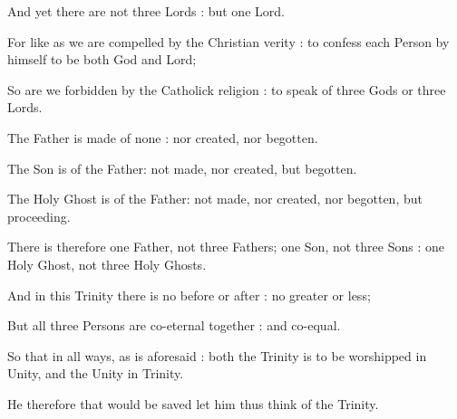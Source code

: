 {    And yet there are not three Lords : but one Lord.\par
    For like as we are compelled by the Christian verity : to confess each Person by himself to be both God and Lord;\par
    So are we forbidden by the Catholick religion : to speak of three Gods or three Lords.\par
    The Father is made of none : nor created, nor begotten.\par
    The Son is of the Father: not made, nor created, but begotten.\par
    The Holy Ghost is of the Father: not made, nor created, nor begotten, but proceeding.\par
    There is therefore one Father, not three Fathers; one Son, not three Sons : one Holy Ghost, not three Holy Ghosts.\par
    And in this Trinity there is no before or after : no greater or less;\par
    But all three Persons are co-eternal together : and co-equal.\par
    So that in all ways, as is aforesaid : both the Trinity is to be worshipped in Unity, and the Unity in Trinity.\par
    He therefore that would be saved let him thus think of the Trinity.\par

}
